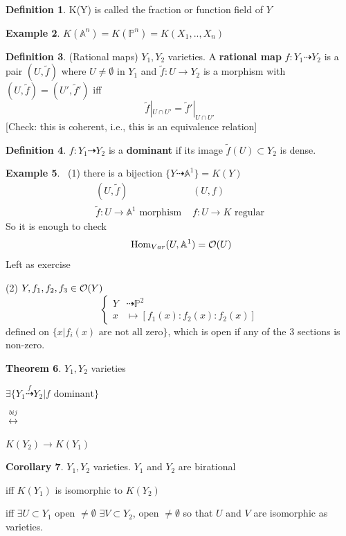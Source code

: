 \documentclass[11pt]{article}
\theoremstyle{definition}
\newtheorem{thm}{Theorem}[section]
\newtheorem{cor}[thm]{Corollary}
\newtheorem{dfn}[thm]{Definition}
\newtheorem{ex}[thm]{Example}
\renewcommand{\hom}{\text{ Hom}}
\newcommand{\affn}{\mathbb A}
\newcommand{\proj}{\mathbb P}
\newcommand{\calo}{{\cal O}}
\newcommand{\lrta}{\longrightarrow}
\newcommand{\llrta}{\longleftrightarrow}
\begin{document}
\begin{dfn}
K(Y) is called the fraction or function field of $Y$
\end{dfn}

\begin{ex}
$K(\affn^n)=K(\proj^n)=K(X_1,..,X_n)$
\end{ex}

\begin{dfn}
(Rational maps) $Y_1,Y_2$ varieties. A \textbf{rational map} $f: Y_1\dashrightarrow Y_2$ is a pair $(U,\tilde{f})$ where $U\neq \emptyset$ in $Y_1$ and $\tilde{f}:U\lrta Y_2$ is a morphism with $(U,\tilde{f})=(U',\tilde{f}')$ iff 
$$
\tilde{f}|_{U\cap U'}=\tilde{f}'|_{U\cap U'}
$$
[Check: this is coherent, i.e., this is an equivalence relation]
\end{dfn}

\begin{dfn}
$f:Y_1\dashrightarrow Y_2$ is a \textbf{dominant} if its image $\tilde{f}(U)\subset Y_2$ is dense.
\end{dfn}

\begin{ex}\ 
(1) there is a bijection $\{Y\dashrightarrow \affn^1\}=K(Y)$
$$
\begin{matrix}
(U,\tilde{f}) & (U,f)\\
\tilde{f}:U\lrta \affn^1\text{ morphism } & f: U\lrta K\text{ regular}
\end{matrix}
$$
So it is enough to check 
$$
\hom_{Var}(U,\affn^1)=\calo(U)
$$
Left as exercise

(2) $Y,f_1,f_2,f_3\in\calo(Y)$
$$
\left\{\begin{aligned}
Y&\dashrightarrow \proj^2\\
x&\longmapsto [f_1(x):f_2(x):f_2(x)]
\end{aligned}\right.
$$
defined on $\{x|f_i (x) \text{ are not all zero}\}$, which is open if any of the $3$ sections is non-zero.
\end{ex}
\begin{thm}
$Y_1,Y_2$ varieties

$\exists \{Y_1\overset{f}{\dashrightarrow} Y_2|f \text{ dominant}\}$

$\overset{bij}{\llrta}$

$K(Y_2)\lrta K(Y_1)$
\end{thm}

\begin{cor}
$Y_1, Y_2$ varieties. $Y_1$ and $Y_2$ are birational 

iff $K(Y_1)$ is isomorphic to $K(Y_2)$

iff $\exists U\subset Y_1$ open $\neq \emptyset$
$\exists V\subset Y_2$, open $\neq \emptyset$ so that $U$ and $V$ are isomorphic as varieties.
\end{cor}
\end{document}
